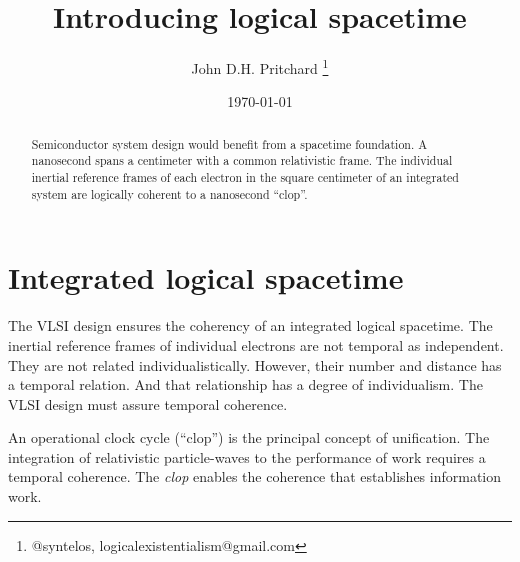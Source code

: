 \documentclass[12pt,twocolumn]{article}
\begin{document}
\title{Introducing logical spacetime}

\author{John D.H. Pritchard \thanks{@syntelos, logicalexistentialism@gmail.com}}

\date{\today}

\maketitle


\begin{abstract}

Semiconductor system design would benefit from a spacetime foundation.
A nanosecond spans a centimeter with a common relativistic frame.  The
individual inertial reference frames of each electron in the square
centimeter of an integrated system are logically coherent to a
nanosecond ``clop''.
  
\end{abstract}


\section{Integrated logical spacetime}

The VLSI design ensures the coherency of an integrated logical
spacetime.  The inertial reference frames of individual electrons are
not temporal as independent.  They are not related
individualistically.  However, their number and distance has a
temporal relation.  And that relationship has a degree of
individualism.  The VLSI design must assure temporal coherence.

An operational clock cycle (``clop'') is the principal concept of
unification.  The integration of relativistic particle-waves to the
performance of work requires a temporal coherence.  The {\it clop}
enables the coherence that establishes information work.



%
%

\end{document}
